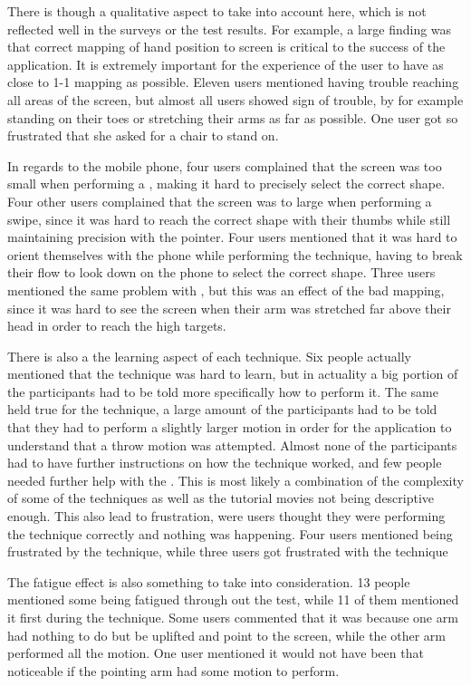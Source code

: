There is though a qualitative aspect to take into account here, which is not reflected well in the surveys or the test results. For example, a large finding was that correct mapping of hand position to screen is critical to the success of the application.
It is extremely important for the experience of the user to have as close to 1-1 mapping as possible. 
Eleven users mentioned having trouble reaching all areas of the screen, but almost all users showed sign of trouble, by for example standing on their toes or stretching their arms as far as possible.
One user got so frustrated that she asked for a chair to stand on. 

In regards to the mobile phone, four users complained that the screen was too small when performing a \pinch, making it hard to precisely select the correct shape.
Four other users complained that the screen was to large when performing a swipe, since it was hard to reach the correct shape with their thumbs while still maintaining precision with the pointer. 
Four users mentioned that it was hard to orient themselves with the phone while performing the \throw technique, having to break their flow to look down on the phone to select the correct shape. 
Three users mentioned the same problem with \swipe, but this was an effect of the bad mapping, since it was hard to see the screen when their arm was stretched far above their head in order to reach the high targets. 

There is also a the learning aspect of each technique. Six people actually mentioned that the \pinch technique was hard to learn, but in actuality a big portion of the participants had to be told more specifically how to perform it. 
The same held true for the \throw technique, a large amount of the participants had to be told that they had to perform a slightly larger motion in order for the application to understand that a throw motion was attempted.
Almost none of the participants had to have further instructions on how the \swipe technique worked, and few people needed further help with the \tilt. 
This is most likely a combination of the complexity of some of the techniques as well as the tutorial movies not being descriptive enough. 
This also lead to frustration, were users thought they were performing the technique correctly and nothing was happening. 
Four users mentioned being frustrated by the \pinch technique, while three users got frustrated with the \tilt technique

The fatigue effect is also something to take into consideration. 13 people mentioned some being fatigued through out the test, while 11 of them mentioned it first during the \throw technique.
Some users commented that it was because one arm had nothing to do but be uplifted and point to the screen, while the other arm performed all the motion.
One user mentioned it would not have been that noticeable if the pointing arm had some motion to perform. 

